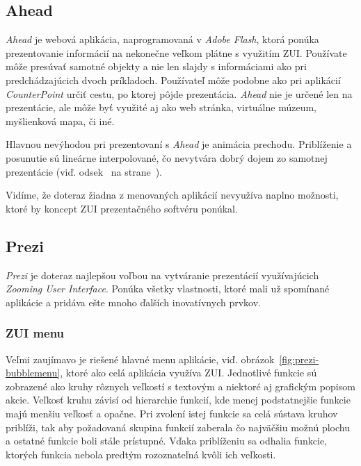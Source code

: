\subsection{Ahead}

\textit{Ahead} je webová aplikácia, naprogramovaná v \textit{Adobe Flash}, ktorá ponúka prezentovanie informácií na nekonečne veľkom plátne s využitím ZUI. Používate môže presúvať samotné objekty a nie len slajdy s informáciami ako pri predchádzajúcich dvoch príkladoch. Používateľ môže podobne ako pri aplikácií \textit{CounterPoint} určiť cestu, po ktorej pôjde prezentácia. \textit{Ahead} nie je určené len na prezentácie, ale môže byť využité aj ako web stránka, virtuálne múzeum, myšlienková mapa, či iné.

Hlavnou nevýhodou pri prezentovaní s \textit{Ahead} je animácia prechodu. Priblíženie a posunutie sú lineárne interpolované, čo nevytvára dobrý dojem zo samotnej prezentácie (viď. odsek~ na strane~\pageref{sec:linear-interpolation}).

Vidíme, že doteraz žiadna z menovaných aplikácií nevyužíva naplno možnosti, ktoré by koncept ZUI prezentačného softvéru ponúkal.

\subsection{Prezi} \label{sec:prezi}

\textit{Prezi} je doteraz najlepšou voľbou na vytváranie prezentácií využívajúcich \textit{Zooming User Interface}. Ponúka všetky vlastnosti, ktoré mali už spomínané aplikácie a pridáva ešte mnoho ďalších inovatívnych prvkov.

\subsubsection{ZUI menu}

Veľmi zaujímavo je riešené hlavné menu aplikácie, viď. obrázok~\ref{fig:prezi-bubblemenu}, ktoré ako celá aplikácia využíva ZUI. Jednotlivé funkcie sú zobrazené ako kruhy rôznych veľkostí s textovým a niektoré aj grafickým popisom akcie. Veľkosť kruhu závisí od hierarchie funkcií, kde menej podstatnejšie funkcie majú menšiu veľkosť a opačne. Pri zvolení istej funkcie sa celá sústava kruhov priblíži, tak aby požadovaná skupina funkcií zaberala čo najväčšiu možnú plochu a ostatné funkcie boli stále prístupné. Vďaka priblíženiu sa odhalia funkcie, ktorých funkcia nebola predtým rozoznateľná kvôli ich veľkosti.


